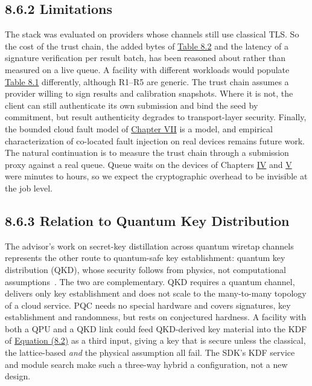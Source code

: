 \documentclass{report}
\theoremstyle{plain}
\theoremstyle{definition}
\theoremstyle{remark}
\begin{document}
\subsection{8.6.2 Limitations}\label{sec:pqc:limitations}

The stack was evaluated on providers whose channels still use classical TLS. So the cost of the trust chain, the added bytes of \hyperref[tab:pqc:algorithms]{Table 8.2} and the latency of a signature verification per result batch, has been reasoned about rather than measured on a live queue. A facility with different workloads would populate \hyperref[tab:pqc:assets]{Table 8.1} differently, although R1--R5 are generic. The trust chain assumes a provider willing to sign results and calibration snapshots. Where it is not, the client can still authenticate its own submission and bind the seed by commitment, but result authenticity degrades to transport-layer security. Finally, the bounded cloud fault model of \hyperref[ch:qec]{Chapter VII} is a model, and empirical characterization of co-located fault injection on real devices remains future work. The natural continuation is to measure the trust chain through a submission proxy against a real queue. Queue waits on the devices of Chapters \hyperref[ch:qml]{IV} and \hyperref[ch:nisq]{V} were minutes to hours, so we expect the cryptographic overhead to be invisible at the job level.

\subsection{8.6.3 Relation to Quantum Key Distribution}\label{sec:pqc:qkd}

The advisor's work on secret-key distillation across quantum wiretap channels~\cite{pan2020secretkey} represents the other route to quantum-safe key establishment: quantum key distribution (QKD), whose security follows from physics, not computational assumptions~\cite{bennett1984bb84,vazirani2014diqkd}. The two are complementary. QKD requires a quantum channel, delivers only key establishment and does not scale to the many-to-many topology of a cloud service. PQC needs no special hardware and covers signatures, key establishment and randomness, but rests on conjectured hardness. A facility with both a QPU and a QKD link could feed QKD-derived key material into the KDF of \hyperref[eq:pqc:hybrid]{Equation (8.2)} as a third input, giving a key that is secure unless the classical, the lattice-based \emph{and} the physical assumption all fail. The SDK's KDF service and module search make such a three-way hybrid a configuration, not a new design.
\end{document}
